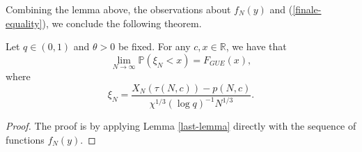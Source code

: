 Combining the lemma above, the observations about $f_N(y)$ and (\ref{finale-equality}), we conclude the following theorem.
\begin{theorem}
Let $q \in (0,1)$ and $\theta > 0$ be fixed. For any $c, x \in \mathbb{R}$, we have that $$\lim_{N \rightarrow \infty} \mathbb{P}(\xi_N < x) = F_{GUE}(x),$$ where $$\xi_N = \frac{X_N(\tau(N,c)) - p(N,c)}{\chi^{1/3} (\log q)^{-1} N^{1/3}}.$$
\end{theorem}
\begin{proof}
The proof is by applying Lemma \ref{last-lemma} directly with the sequence of functions $f_N(y)$.
\end{proof}